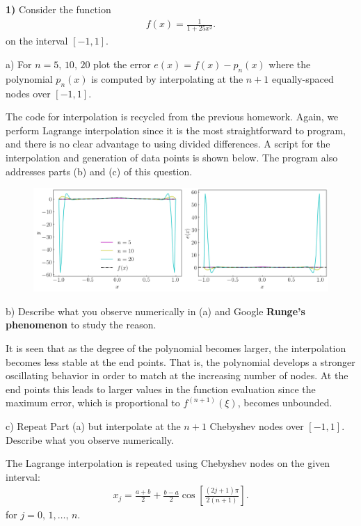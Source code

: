 \documentclass[12pt,a4paper]{article}
\newcommand{\prob}[2]{\textbf{#1)} #2}
\begin{document}
\prob{1}{Consider the function
\begin{align*}
    f(x) = \frac{1}{1 + 25 x^2}
.\end{align*}
on the interval $\left[ -1,1 \right]$.
}

a) For $n = 5,\,10,\,20$ plot the error $e(x) = f(x) - p_{n}(x)$ where the polynomial $p_{n}(x)$ is computed by interpolating at the $n+1$ equally-spaced nodes over $[-1,1]$.

The code for interpolation is recycled from the previous homework.
Again, we perform Lagrange interpolation since it is the most straightforward to program, and there is no clear advantage to using divided differences.
A script for the interpolation and generation of data points is shown below.
The program also addresses parts (b) and (c) of this question.


\begin{figure}[H]
    \begin{center}
        \includegraphics[scale=0.45]{./fig1.png} 
    \end{center}
\end{figure}

b) Describe what you observe numerically in (a) and Google \textbf{Runge's phenomenon} to study the reason.

It is seen that as the degree of the polynomial becomes larger, the interpolation becomes less stable at the end points.
That is, the polynomial develops a stronger oscillating behavior in order to match at the increasing number of nodes.
At the end points this leads to larger values in the function evaluation since the maximum error, which is proportional to $f^{\left( n+1 \right)}(\xi)$, becomes unbounded.

c) Repeat Part (a) but interpolate at the $n+1$ Chebyshev nodes over $[-1,1]$.
Describe what you observe numerically.

The Lagrange interpolation is repeated using Chebyshev nodes on the given interval:
\begin{align*}
    x_{j} = \frac{a+b}{2} + \frac{b-a}{2}\cos{\left[ \frac{\left( 2j+1 \right)\pi}{2\left( n+1 \right)} \right]}
.\end{align*}
for $j = 0,\,1,\ldots,\,n$.
\end{document}
